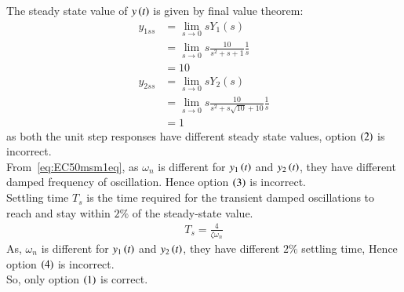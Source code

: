 \documentclass[journal,12pt,onecolumn]{IEEEtran}
\theoremstyle{remark}
\begin{document}
    The steady state value of $y\left(t\right)$ is given by final value theorem:
    \begin{align}
    y_{1ss} &= \lim_{{s \to 0}} sY_{1}(s)\\
    &= \lim_{{s \to 0}} s \frac{10}{s^{2} + s + 1}  \frac{1}{s}\\
    &= 10\\
    y_{2ss} &= \lim_{{s \to 0}} sY_{2}(s)\\
    &= \lim_{{s \to 0}} s \frac{10}{s^{2}+s\sqrt{10} +10}  \frac{1}{s}\\
    &= 1
    \end{align} 
    as both the unit step responses have different steady state values, option $\left(2\right)$ is incorrect.\\
    From~\eqref{eq:EC50msm1eq}, as $\omega_{n}$ is different for $y_{1}\left(t\right)$ and $y_{2}\left(t\right)$, they have different damped frequency of oscillation. Hence option $\left(3\right)$ is incorrect.\\
    Settling time $T_s$ is the time required for the transient damped oscillations to reach and stay within $2\%$ of the steady-state value.
    \begin{align}
    T_s = \frac{4}{\zeta \omega_n}
    \end{align}
    As, $\omega_{n}$ is different for $y_{1}\left(t\right)$ and $y_{2}\left(t\right)$, they have different $2\%$ settling time, Hence option $\left(4\right)$ is incorrect.\\
    So, only option $\left(1\right)$ is correct.   
\end{document}
